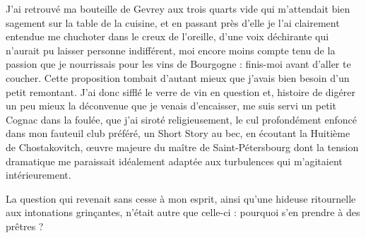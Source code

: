 J’ai retrouvé ma bouteille de Gevrey aux trois quarts vide qui m’attendait bien sagement sur la table de la cuisine, et en passant près d’elle je l’ai clairement entendue me chuchoter dans le creux de l’oreille, d’une voix déchirante qui n’aurait pu laisser personne indifférent, moi encore moins compte tenu de la passion que je nourrissais pour les vins de Bourgogne : finis-moi avant d’aller te coucher. Cette proposition tombait d’autant mieux que j’avais bien besoin d’un petit remontant. J’ai donc sifflé le verre de vin en question et, histoire de digérer un peu mieux la déconvenue que je venais d’encaisser, me suis servi un petit Cognac dans la foulée, que j’ai siroté religieusement, le cul profondément enfoncé dans mon fauteuil club préféré, un Short Story au bec, en écoutant la Huitième de Chostakovitch, œuvre majeure du maître de Saint-Pétersbourg dont la tension dramatique me paraissait idéalement adaptée aux turbulences qui m’agitaient intérieurement.


La question qui revenait sans cesse à mon esprit, ainsi qu’une hideuse ritournelle aux intonations grinçantes, n’était autre que celle-ci : pourquoi s’en prendre à des prêtres ?

